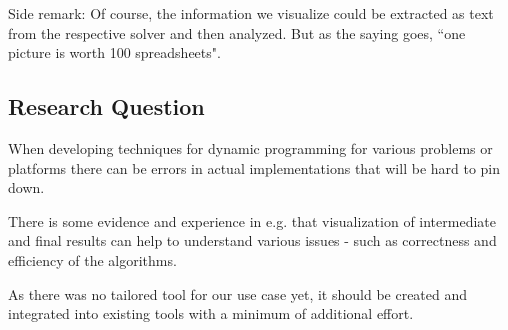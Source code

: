 \documentclass[a4paper, 12pt, bibliography=totoc]{scrartcl}
\begin{document}
\vspace{2cm}
{\small{Side remark:}
	Of course, the information we visualize could be extracted as text from the respective solver and then analyzed. But as the saying goes, ``one picture is worth 100 spreadsheets". }
\newpage
\subsection{Research Question}
When developing techniques for dynamic programming for various problems or platforms there can be errors in actual implementations that will be hard to pin down. 

There is some evidence and experience in e.g. \cite{SoftwareVisualization, ELVIZ} that visualization of intermediate and final results can help to understand various issues - such as correctness and efficiency of the algorithms.

As there was no tailored tool for our use case yet, it should be created and integrated into existing tools with a minimum of additional effort.
\end{document}
